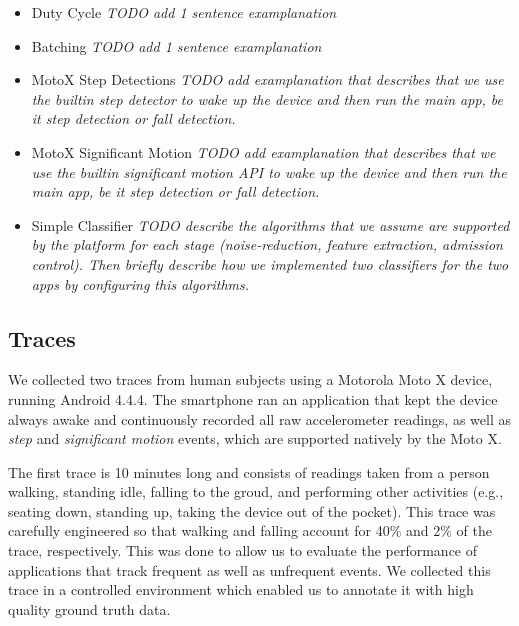 \begin{itemize}

\item Duty Cycle {\em TODO add 1 sentence examplanation}

\item Batching {\em TODO add 1 sentence examplanation}

\item MotoX Step Detections {\em TODO add examplanation that describes that we use the builtin step detector to wake up the device and then run the main app, be it step detection or fall detection.}

\item MotoX Significant Motion {\em TODO add examplanation that describes that we use the builtin significant motion API to wake up the device and then run the main app, be it step detection or fall detection.}

\item Simple Classifier {\em TODO describe the algorithms that we assume are supported by the platform for each stage (noise-reduction, feature extraction, admission control).  Then briefly describe how we implemented two classifiers for the two apps by configuring this algorithms.} 

\end{itemize}

\subsection{Traces}

We collected two traces from human subjects using a Motorola Moto X
device, running Android 4.4.4.  The smartphone ran an application that
kept the device always awake and continuously recorded all raw
accelerometer readings, as well as {\em step} and {\em significant
  motion} events, which are supported natively by the Moto X.

The first trace is 10 minutes long and consists of readings taken from
a person walking, standing idle, falling to the groud, and performing
other activities (e.g., seating down, standing up, taking the device
out of the pocket). This trace was carefully engineered so that
walking and falling account for 40\% and 2\% of the trace,
respectively.  This was done to allow us to evaluate the performance
of applications that track frequent as well as unfrequent events.  We
collected this trace in a controlled environment which enabled us to
annotate it with high quality ground truth data.

